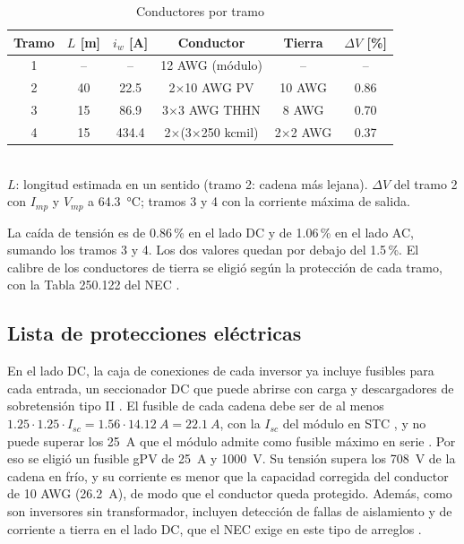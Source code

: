 \begin{table}[!htb]
\caption{Conductores por tramo}
\label{tab:cables}
\centering
\footnotesize
\setlength{\tabcolsep}{2.5pt}
\begin{tabular}{c c c c c c}
\toprule
Tramo & $L$ [m] & $i_w$ [A] & Conductor & Tierra & $\Delta V$ [\%] \\
\midrule
1 & {--} & {--} & 12 AWG (módulo) & {--} & {--} \\
2 & 40 & 22.5 & 2$\times$10 AWG PV & 10 AWG & 0.86 \\
3 & 15 & 86.9 & 3$\times$3 AWG THHN & 8 AWG & 0.70 \\
4 & 15 & 434.4 & 2$\times$(3$\times$250 kcmil) & 2$\times$2 AWG & 0.37 \\
\bottomrule
\end{tabular}
\\[2pt]
{\footnotesize $L$: longitud estimada en un sentido (tramo 2: cadena más lejana). $\Delta V$ del tramo 2 con $I_{mp}$ y $V_{mp}$ a \SI{64.3}{\celsius}; tramos 3 y 4 con la corriente máxima de salida.}
\end{table}

La caída de tensión es de 0.86\,\% en el lado DC y de 1.06\,\% en el lado AC, sumando los tramos 3 y 4. Los dos valores quedan por debajo del 1.5\,\%. El calibre de los conductores de tierra se eligió según la protección de cada tramo, con la Tabla 250.122 del NEC \cite{nec2014}.

\subsection{Lista de protecciones eléctricas}

En el lado DC, la caja de conexiones de cada inversor ya incluye fusibles para cada entrada, un seccionador DC que puede abrirse con carga y descargadores de sobretensión tipo II \cite{cps_ds}. El fusible de cada cadena debe ser de al menos $1.25\cdot1.25\cdot I_{sc}=1.56\cdot\SI{14.12}{A}=\SI{22.1}{A}$, con la $I_{sc}$ del módulo en STC \cite{nec2014}, y no puede superar los \SI{25}{A} que el módulo admite como fusible máximo en serie \cite{aiko_ds}. Por eso se eligió un fusible gPV de \SI{25}{A} y \SI{1000}{V}. Su tensión supera los \SI{708}{V} de la cadena en frío, y su corriente es menor que la capacidad corregida del conductor de 10 AWG (\SI{26.2}{A}), de modo que el conductor queda protegido. Además, como son inversores sin transformador, incluyen detección de fallas de aislamiento y de corriente a tierra en el lado DC, que el NEC exige en este tipo de arreglos \cite{nec2014}.

